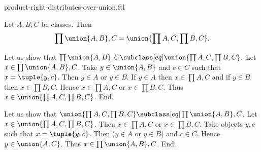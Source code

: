 \documentclass{article}
\begin{document}
\begin{smodule}[creators={Marcel Schütz}]{product-right-distributes-over-union.ftl}

  \begin{fproposition*}[label=8196927485116416]
    Let $A, B, C$ be classes.
    Then \[\prod{\union{A,B},C} = \union{\prod{A,C},\prod{B,C}}.\]
  \end{fproposition*}
  \begin{fproof}
    Let us show that $\prod{\union{A,B},C} \subclass[eq] \union{\prod{A,C},\prod{B,C}}.$
      Let $x \in \prod{\union{A,B},C}$.
      Take $y \in \union{A,B}$ and $c \in C$ such that $x = \tuple{y,c}$.
      Then $y \in A$ or $y \in B$.
      If $y \in A$ then $x \in \prod{A,C}$ and if $y \in B$ then $x \in \prod{B,C}$.
      Hence $x \in \prod{A,C}$ or $x \in \prod{B,C}$.
      Thus $x \in \union{\prod{A,C},\prod{B,C}}$.
    End.

    Let us show that $\union{\prod{A,C},\prod{B,C}} \subclass[eq]
    \prod{\union{A,B},C}$.
      Let $x \in \union{\prod{A,C},\prod{B,C}}$.
      Then $x \in \prod{A,C}$ or $x \in \prod{B,C}$.
      Take objects $y, c$ such that $x = \tuple{y,c}$.
      Then ($y \in A$ or $y \in B$) and $c \in C$.
      Hence $y \in \union{A,C}$.
      Thus $x \in \prod{\union{A,B},C}$.
    End.
  \end{fproof}
\end{smodule}
\end{document}
